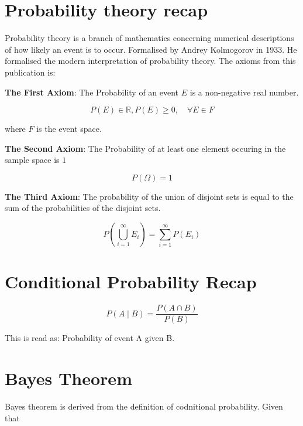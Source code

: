 \section{Probability theory recap}
Probability theory is a branch of mathematics concerning numerical descriptions
of how likely an event is to occur. Formalised by Andrey Kolmogorov in 1933.
\cite{kolmogorov2018foundations} He formalised the modern interpretation of 
probability theory. The axioms from this publication is:

\medskip

\textbf{The First Axiom}: The Probability of an event $E$ is a non-negative real
number.

\begin{equation}
    P(E) \in \mathbb{R}, P(E) \geq 0, \quad \forall E \in F 
\end{equation}

where $F$ is the event space.

\medskip

\textbf{The Second Axiom}: The Probability of at least one element occuring in
the sample space is $1$

\begin{equation}
    P(\Omega) = 1
\end{equation}

\medskip

\textbf{The Third Axiom}: The probability of the union of disjoint sets is equal
to the sum of the probabilities of the disjoint sets.

\begin{equation}
    P\left(\bigcup_{i = 1}^{\infty} E_i \right) = \sum_{i = 1}^{\infty} P(E_i)
\end{equation}

\section{Conditional Probability Recap}

\begin{equation*}
P(A \mid B) = \frac{P(A \cap  B)}{P(B)}
\end{equation*}

This is read as: Probability of event A given B. 

\section{Bayes Theorem}

Bayes theorem is derived from the definition of codnitional 
probability. Given that


